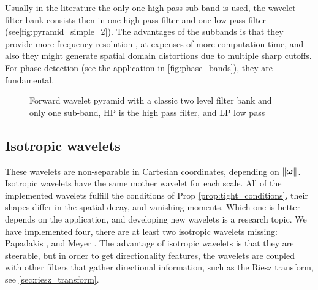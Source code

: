 Usually in the literature the only one high-pass sub-band is used, the wavelet filter bank consists then in one high pass filter and one low pass filter (see\autoref{fig:pyramid_simple_2}). The advantages of the subbands is that they provide more frequency resolution \cite{held_steerable_2010}, at expenses of more computation time, and also they might generate spatial domain distortions due to multiple sharp cutoffs. For phase detection (see the application in \autoref{fig:phase_bands}), they are fundamental.
\begin{figure}[H]
  \centering
  
  \caption{Forward wavelet pyramid with a classic two level filter bank and only one sub-band, HP is the high pass filter, and LP low pass}
  \label{fig:pyramid_simple_2}
\end{figure}


\subsection{Isotropic wavelets}
\label{sub:isotropic_wavelets}
These wavelets are non-separable in Cartesian coordinates, depending on $\norm{\bm{\omega}}$. Isotropic wavelets have the same mother wavelet for each scale. All of the implemented wavelets fulfill the conditions of Prop \ref{prop:tight_conditions}, their shapes differ in the spatial decay, and vanishing moments. Which one is better depends on the application, and developing new wavelets is a research topic. We have implemented four, there are at least \cite{unser_steerable_2011} two isotropic wavelets missing: Papadakis \cite{romero_geometry_2009}, and Meyer \cite{daubechies_ten_1992}.
The advantage of isotropic wavelets is that they are steerable, but in order to get directionality features, the wavelets are coupled with other filters that gather directional information, such as the Riesz transform, see \autoref{sec:riesz_transform}.

